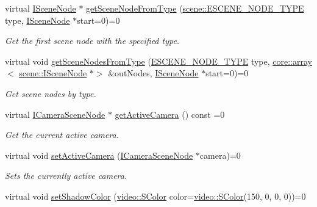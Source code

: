 \begin{DoxyCompactItemize}
virtual \hyperlink{classirr_1_1scene_1_1ISceneNode}{I\+Scene\+Node} $\ast$ \hyperlink{classirr_1_1scene_1_1ISceneManager_a5ab8e8f8cc8456a3ea881c75dfe505bb}{get\+Scene\+Node\+From\+Type} (\hyperlink{namespaceirr_1_1scene_acad3d7ef92a9807d391ba29120f3b7bd}{scene\+::\+E\+S\+C\+E\+N\+E\+\_\+\+N\+O\+D\+E\+\_\+\+T\+Y\+PE} type, \hyperlink{classirr_1_1scene_1_1ISceneNode}{I\+Scene\+Node} $\ast$start=0)=0
\begin{DoxyCompactList}\small\item\em Get the first scene node with the specified type. \end{DoxyCompactList}\item 
virtual void \hyperlink{classirr_1_1scene_1_1ISceneManager_aa920cb095fc901273fd097a39ebc3255}{get\+Scene\+Nodes\+From\+Type} (\hyperlink{namespaceirr_1_1scene_acad3d7ef92a9807d391ba29120f3b7bd}{E\+S\+C\+E\+N\+E\+\_\+\+N\+O\+D\+E\+\_\+\+T\+Y\+PE} type, \hyperlink{classirr_1_1core_1_1array}{core\+::array}$<$ \hyperlink{classirr_1_1scene_1_1ISceneNode}{scene\+::\+I\+Scene\+Node} $\ast$$>$ \&out\+Nodes, \hyperlink{classirr_1_1scene_1_1ISceneNode}{I\+Scene\+Node} $\ast$start=0)=0
\begin{DoxyCompactList}\small\item\em Get scene nodes by type. \end{DoxyCompactList}\item 
virtual \hyperlink{classirr_1_1scene_1_1ICameraSceneNode}{I\+Camera\+Scene\+Node} $\ast$ \hyperlink{classirr_1_1scene_1_1ISceneManager_a71391ee37dece0714d95c519f110010f}{get\+Active\+Camera} () const =0
\begin{DoxyCompactList}\small\item\em Get the current active camera. \end{DoxyCompactList}\item 
virtual void \hyperlink{classirr_1_1scene_1_1ISceneManager_a5d19b7a6803a0a021082fc2b86043b3d}{set\+Active\+Camera} (\hyperlink{classirr_1_1scene_1_1ICameraSceneNode}{I\+Camera\+Scene\+Node} $\ast$camera)=0
\begin{DoxyCompactList}\small\item\em Sets the currently active camera. \end{DoxyCompactList}\item 
\mbox{\label{classirr_1_1scene_1_1ISceneManager_a074feb54d61f5402befef5e1bf0aff37}} 
virtual void \hyperlink{classirr_1_1scene_1_1ISceneManager_a074feb54d61f5402befef5e1bf0aff37}{set\+Shadow\+Color} (\hyperlink{classirr_1_1video_1_1SColor}{video\+::\+S\+Color} color=\hyperlink{classirr_1_1video_1_1SColor}{video\+::\+S\+Color}(150, 0, 0, 0))=0
$$
\end{DoxyCompactItemize}
